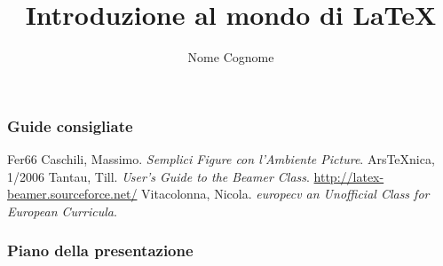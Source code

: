 \documentclass[svgnames,%
	ucs,%
	pdftex]{guitbeamer}
\title{Introduzione al mondo di \LaTeX}
\author[Nome Cognome]{Nome Cognome}
\date{} %
\begin{document}
\frame{\titlepage}
\begin{frame}
  \frametitle{Guide consigliate}
	\begin{thebibliography}{Fer66}
			Caschili, Massimo.
			\newblock\textit{Semplici Figure con l'Ambiente Picture}.
			\newblock  Ars\TeX nica, 1/2006
			Tantau, Till.
			\newblock\textit{User's Guide to the Beamer Class}.
			\newblock
			{\small\url{http://latex-beamer.sourceforce.net/}}
			Vitacolonna, Nicola.
			\newblock\textit{europecv an Unofficial Class for European Curricula}.
	\end{thebibliography}
\end{frame}
\begin{frame}
  \frametitle{Piano della presentazione}
  \tableofcontents
\end{frame}
\end{document}
